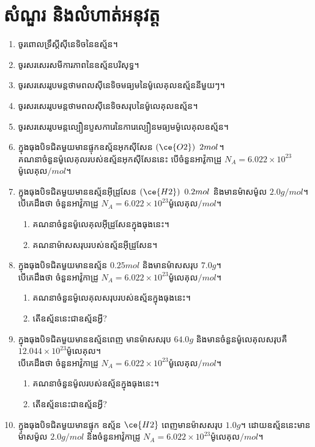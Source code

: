 \section{សំណួរ និងលំហាត់អនុវត្ត}
\begin{enumerate}[m]
	\item ចូរពោលទ្រឹស្តីសុីនេទិចនៃឧស្ម័ន។
	\item ចូរសរសេរសមីការភាពនៃឧស្ម័នបរិសុទ្ធ។
	\item ចូរសរសេររូបមន្តថាមពលសុីនេទិចមធ្យមនៃម៉ូលេគុលឧស្ម័ននីមួយៗ។
	\item ចូរសរសេររូបមន្តថាមពលសុីនេទិចសរុបនៃម៉ូលេគុលឧស្ម័ន។
	\item ចូរសរសេររូបមន្តល្បឿនប្ញសការេនៃការេល្បឿនមធ្យមម៉ូលេគុលឧស្ម័ន។
	\item ក្នុងធុងបិទជិតមួយមានផ្ទុកឧស្ម័នអុកសុីសែន $\left(\ce{O2}\right)~2mol$។\\
	គណនាចំនួនម៉ូលេគុលរបស់ឧស្ម័នអុកសុីសែននេះ បើចំនួនអាវ៉ូកាដ្រូ $N_{A}=6.022\times10^{23}$ ម៉ូលេគុល$/mol$។
	\item ក្នុងធុងបិទជិតមួយមានឧស្ម័នអុីដ្រូសែន $\left(\ce{H2}\right)~0.2mol$ និងមានម៉ាសម៉ូល $2.0g/mol$។\\
	បើគេដឹងថា ចំនួនអាវ៉ូកាដ្រូ $N_{A}=6.022\times10^{23}$ម៉ូលេគុល$/mol$។
	\begin{enumerate}[k]
		\item គណនាចំនួនម៉ូលេគុលអុីដ្រូសែនក្នុងធុងនេះ។
		\item គណនាម៉ាសសរុបរបស់ឧស្ម័នអុីដ្រូសែន។
	\end{enumerate}
	\item ក្នុងធុងបិទជិតមួយមានឧស្ម័ន $0.25mol$ និងមានម៉ាសសរុប $7.0g$។\\
	បើគេដឹងថា ចំនួនអាវ៉ូកាដ្រូ $N_{A}=6.022\times10^{23}$ម៉ូលេគុល$/mol$។
	\begin{enumerate}[k]
		\item គណនាចំនួនម៉ូលេគុលសរុបរបស់ឧស្ម័នក្នុងធុងនេះ។
		\item តើឧស្ម័ននេះជាឧស្ម័នអ្វី?
	\end{enumerate}
	\item ក្នុងធុងបិទជិតមួយមានឧស្ម័នពេញ មានម៉ាសសរុប $64.0g$ និងមានចំនួនម៉ូលេគុលសរុបគឺ $12.044\times10^{23}$ម៉ូលេគុល។\\
	បើគេដឹងថា ចំនួនអាវ៉ូកាដ្រូ $N_{A}=6.022\times10^{23}$ម៉ូលេគុល$/mol$។
	\begin{enumerate}[k]
		\item គណនាចំនួនម៉ូលរបស់ឧស្ម័នក្នុងធុងនេះ។
		\item តើឧស្ម័ននេះជាឧស្ម័នអ្វី?
	\end{enumerate}
	\item ក្នុងធុងបិទជិតមួយមានផ្ទុក ឧស្ម័ន $\ce{H2}$ ពេញមានម៉ាសសរុប $1.0g$។ ដោយឧស្ម័ននេះមានម៉ាសម៉ូល $2.0g/mol$ និងចំនួនអាវ៉ូកាដ្រូ $N_{A}=6.022\times10^{23}$ម៉ូលេគុល$/mol$។

\end{enumerate}
